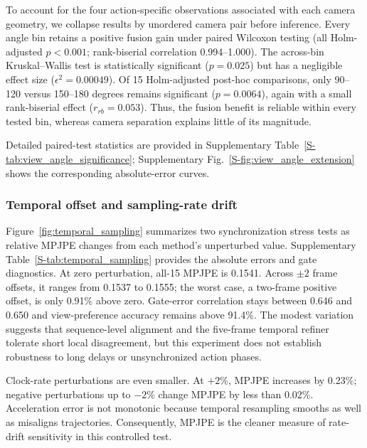\documentclass[preprint,12pt]{elsarticle}
\begin{document}


To account for the four action-specific observations associated with each camera geometry, we collapse results by unordered camera pair before inference. Every angle bin retains a positive fusion gain under paired Wilcoxon testing (all Holm-adjusted \(p<0.001\); rank-biserial correlation 0.994--1.000). The across-bin Kruskal--Wallis test is statistically significant (\(p=0.025\)) but has a negligible effect size (\(\epsilon^2=0.00049\)). Of 15 Holm-adjusted post-hoc comparisons, only 90--120 versus 150--180 degrees remains significant (\(p=0.0064\)), again with a small rank-biserial effect (\(r_{rb}=0.053\)). Thus, the fusion benefit is reliable within every tested bin, whereas camera separation explains little of its magnitude.

Detailed paired-test statistics are provided in Supplementary Table~\ref{S-tab:view_angle_significance}; Supplementary Fig.~\ref{S-fig:view_angle_extension} shows the corresponding absolute-error curves.



\subsubsection{Temporal offset and sampling-rate drift}

Figure~\ref{fig:temporal_sampling} summarizes two synchronization stress tests as relative MPJPE changes from each method's unperturbed value. Supplementary Table~\ref{S-tab:temporal_sampling} provides the absolute errors and gate diagnostics. At zero perturbation, all-15 MPJPE is 0.1541. Across \(\pm2\) frame offsets, it ranges from 0.1537 to 0.1555; the worst case, a two-frame positive offset, is only 0.91\% above zero. Gate-error correlation stays between 0.646 and 0.650 and view-preference accuracy remains above 91.4\%. The modest variation suggests that sequence-level alignment and the five-frame temporal refiner tolerate short local disagreement, but this experiment does not establish robustness to long delays or unsynchronized action phases.

Clock-rate perturbations are even smaller. At \(+2\%\), MPJPE increases by 0.23\%; negative perturbations up to \(-2\%\) change MPJPE by less than 0.02\%. Acceleration error is not monotonic because temporal resampling smooths as well as misaligns trajectories. Consequently, MPJPE is the cleaner measure of rate-drift sensitivity in this controlled test.
\end{document}
